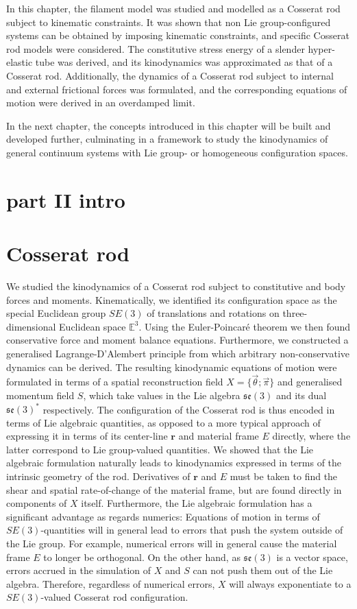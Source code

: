 \documentclass[]{cam-thesis}
\begin{document}
In this chapter, the filament model was studied and modelled as a Cosserat rod subject to kinematic constraints. It was shown that non Lie group-configured systems can be obtained by imposing kinematic constraints, and specific Cosserat rod models were considered. The constitutive stress energy of a slender hyper-elastic tube was derived, and its kinodynamics was approximated as that of a Cosserat rod. Additionally, the dynamics of a Cosserat rod subject to internal and external frictional forces was formulated, and the corresponding equations of motion were derived in an overdamped limit. 

In the next chapter, the concepts introduced in this chapter will be built and developed further, culminating in a framework to study the kinodynamics of general continuum systems with Lie group- or homogeneous configuration spaces.

\section{part II intro}

\section{Cosserat rod}


We studied the kinodynamics of a Cosserat rod subject to constitutive and body forces and moments. Kinematically, we identified its configuration space as the special Euclidean group $SE(3)$ of translations and rotations on three-dimensional Euclidean space $\mathbb{E}^3$. Using the Euler-Poincaré theorem we then found conservative force and moment balance equations. Furthermore, we constructed a generalised Lagrange-D'Alembert principle from which arbitrary non-conservative dynamics can be derived. The resulting kinodynamic equations of motion were formulated in terms of a spatial reconstruction field $X = \{ \vec{\theta} ; \vec{\pi} \}$ and generalised momentum field $S$, which take values in the Lie algebra $\mathfrak{se}(3)$ and its dual $\mathfrak{se}(3)^*$ respectively. The configuration of the Cosserat rod is thus encoded in terms of Lie algebraic quantities, as opposed to a more typical approach of expressing it in terms of its center-line $\mathbf{r}$ and material frame $E$ directly, where the latter correspond to Lie group-valued quantities. We showed that the Lie algebraic formulation naturally leads to kinodynamics expressed in terms of the intrinsic geometry of the rod. Derivatives of $\mathbf{r}$ and $E$ must be taken to find the shear and spatial rate-of-change of the material frame, but are found directly in components of $X$ itself. Furthermore, the Lie algebraic formulation has a significant advantage as regards  numerics: Equations of motion in terms of $SE(3)$-quantities will in general lead to errors that push the system outside of the Lie group. For example, numerical errors will in general cause the material frame $E$ to longer be orthogonal. On the other hand, as $\mathfrak{se}(3)$ is a vector space, errors accrued in the simulation of $X$ and $S$ can not push them out of the Lie algebra. Therefore, regardless of numerical errors, $X$ will always exponentiate to a $SE(3)$-valued Cosserat rod configuration.
\end{document}
